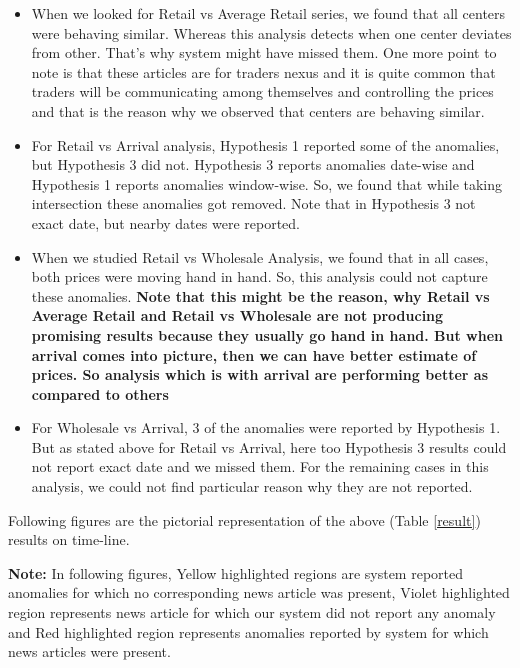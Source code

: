 \begin{itemize}

	\item When we looked for Retail vs Average Retail series, we found that all centers were behaving similar. Whereas this analysis detects when one center deviates from other. That's why system might have missed them. One more point to note is that these articles are for traders nexus and it is quite common that traders will be communicating among themselves and controlling the prices and that is the reason why we observed that centers are behaving similar.
	
	\item For Retail vs Arrival analysis, Hypothesis 1 reported some of the anomalies, but Hypothesis 3 did not. Hypothesis 3 reports anomalies date-wise and Hypothesis 1 reports anomalies window-wise. So, we found that while taking intersection these anomalies got removed. Note that in Hypothesis 3 not exact date, but nearby dates were reported.
	
	\item When we studied Retail vs Wholesale Analysis, we found that in all cases, both prices were moving hand in hand. So, this analysis could not capture these anomalies. \textbf{ Note that this might be the reason, why Retail vs Average Retail and Retail vs Wholesale are not producing promising results because they usually go hand in hand. But when arrival comes into picture, then we can have better estimate of prices. So analysis which is with arrival are performing better as compared to others}
	
	\item For Wholesale vs Arrival, 3 of the anomalies were reported by Hypothesis 1. But as stated above for Retail vs Arrival, here too Hypothesis 3 results could not report exact date and we missed them. For the remaining cases in this analysis, we could not find particular reason why they are not reported.
	
\end{itemize}

Following figures are the pictorial representation of the above (Table \ref{result}) results on time-line.

\textbf{Note:} In following figures, Yellow highlighted regions are system reported anomalies for which no corresponding news article was present, Violet highlighted region represents news article for which our system did not report any anomaly and Red highlighted region represents anomalies reported by system for which news articles were present.

